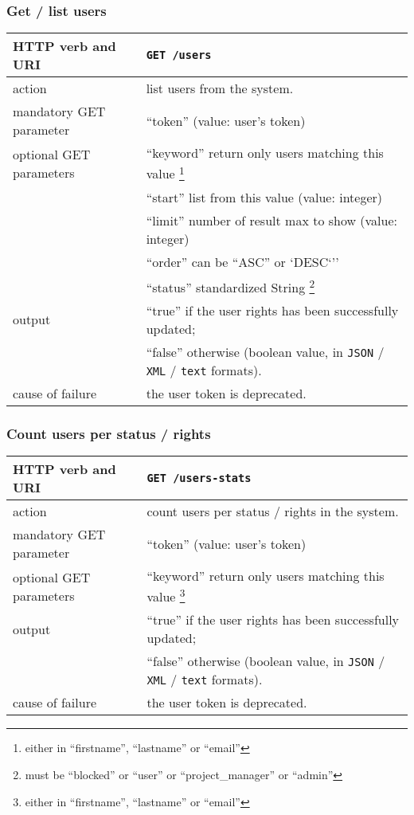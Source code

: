 \subsubsection{Get / list users}
\begin{tabular}{ | l | l | }
	\hline
	HTTP verb and URI & \texttt{GET /users} \\
	\hline
	action & list users from the system. \\
	\hline
	mandatory GET parameter & ``token'' (value: user's token) \\
	\hline
	optional GET parameters & ``keyword'' return only users matching this value \footnote{either in ``firstname'', ``lastname'' or ``email''} \\
	\space & ``start'' list from this value (value: integer) \\
	\space & ``limit'' number of result max to show (value: integer) \\
	\space & ``order'' can be ``ASC'' or `DESC`'' \\
	\space &  ``status'' standardized String \footnote{must be ``blocked'' or ``user'' or ``project\_manager'' or ``admin''} \\		
	\hline
	output & ``true'' if the user rights has been successfully updated; \\
	\space & ``false'' otherwise (boolean value, in \texttt{JSON} / \texttt{XML} / \texttt{text} formats). \\
	\hline
	cause of failure & the user token is deprecated. \\
	\hline
\end{tabular}
\newline

\subsubsection{Count users per status / rights}
\begin{tabular}{ | l | l | }
	\hline
	HTTP verb and URI & \texttt{GET /users-stats} \\
	\hline
	action & count users per status / rights in the system. \\
	\hline
	mandatory GET parameter & ``token'' (value: user's token) \\
	\hline
	optional GET parameters & ``keyword'' return only users matching this value \footnote{either in ``firstname'', ``lastname'' or ``email''} \\	
	\hline
	output & ``true'' if the user rights has been successfully updated; \\
	\space & ``false'' otherwise (boolean value, in \texttt{JSON} / \texttt{XML} / \texttt{text} formats). \\
	\hline
	cause of failure & the user token is deprecated. \\
	\hline
\end{tabular}
\newline

